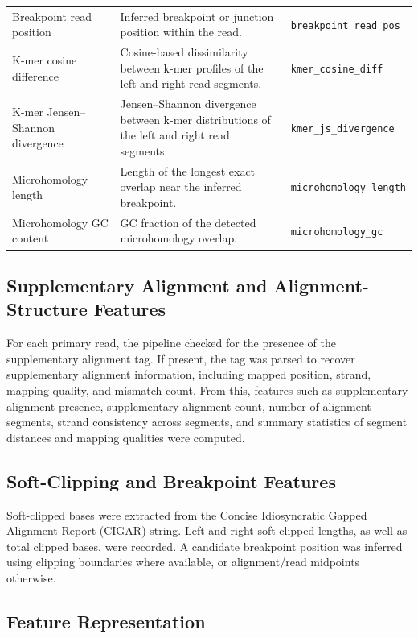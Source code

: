 \begin{xltabular}{\textwidth}{p{3.2cm} X p{3.1cm}}
Breakpoint read position & Inferred breakpoint or junction position within the read. & \texttt{breakpoint\_read\_pos} \\

K-mer cosine difference & Cosine-based dissimilarity between k-mer profiles of the left and right read segments. & \texttt{kmer\_cosine\_diff} \\

K-mer Jensen--Shannon divergence & Jensen--Shannon divergence between k-mer distributions of the left and right read segments. & \texttt{kmer\_js\_divergence} \\

Microhomology length & Length of the longest exact overlap near the inferred breakpoint. & \texttt{microhomology\_\allowbreak length} \\

Microhomology GC content & GC fraction of the detected microhomology overlap. & \texttt{microhomology\_gc} \\

\end{xltabular}

\endgroup

\subsection{Supplementary Alignment and Alignment-Structure Features}

For each primary read, the pipeline checked for the presence of the supplementary alignment tag. If present, the tag was parsed to recover supplementary alignment information, including mapped position, strand, mapping quality, and mismatch count. From this, features such as supplementary alignment presence, supplementary alignment count, number of alignment segments, strand consistency across segments, and summary statistics of segment distances and mapping qualities were computed.

\subsection{Soft-Clipping and Breakpoint Features}

Soft-clipped bases were extracted from the Concise Idiosyncratic Gapped Alignment Report (CIGAR) string. Left and right soft-clipped lengths, as well as total clipped bases, were recorded. A candidate breakpoint position was inferred using clipping boundaries where available, or alignment/read midpoints otherwise.
\subsection{Feature Representation}

